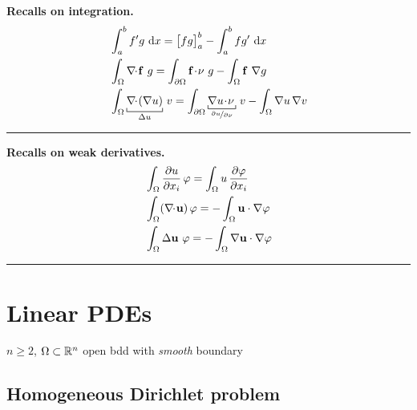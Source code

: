 
\textbf{Recalls on integration.}
\begin{align*}
&\int_a^b f'g\dx = \big[ fg \big]_a^b-\int_a^b fg'\dx \\
&\int_\Omega \nabladot\fv\ g=\int_{\partial\Omega}\fv\!\cdot\!\nu\ g-\int_\Omega \fv\ \nabla g \\
&\int_\Omega \underbracket[0.5pt]{\nabladot\left(\nabla u\right)}_{\Delta u}\,v=\int_{\partial\Omega}\underbracket[0.5pt]{\nabla u\!\cdot\!\nu\,}_{\nicefrac{\partial u}{\partial \nu}}\,v-\int_\Omega \nabla u\,\nabla v
\end{align*}

\rule{0.31\textwidth}{0.2pt}

\textbf{Recalls on weak derivatives.}
\begin{align*}
&\int_\Omega \dfrac{\partial u}{\partial x_i}\,\varphi = \int_\Omega u\,\dfrac{\partial\varphi}{\partial x_i} \\ 
&\int_\Omega (\nabla\!\!\cdot\! \mathbf{u})\,\varphi = -\int_\Omega \mathbf{u}\cdot\nabla\varphi \\
&\int_\Omega \Delta \mathbf{u}\ \varphi = -\int_\Omega \nabla\mathbf{u}\cdot\nabla\varphi
\end{align*}

\rule{0.31\textwidth}{1pt}


\vspace{-1em}

\section{\texorpdfstring{\color{forestgreen(web)}Linear PDEs}{}}


$n\geq 2$, $\Omega\subset\mathbb{R}^n$ open bdd with \emph{smooth} boundary


\subsection{\texorpdfstring{\color{red}Homogeneous Dirichlet problem}{}}

